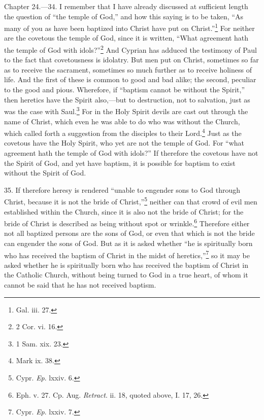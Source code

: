 
Chapter 24.—34. I remember that I have already discussed at sufficient length the question of ``the temple of God,'' and how this saying is to be taken, ``As many of you as have been baptized into Christ have put on Christ.''\footnote{\par  Gal. iii. 27.} For neither are the covetous the temple of God, since it is written, ``What agreement hath the temple of God with idols?''\footnote{\par  2 Cor. vi. 16.} And Cyprian has adduced the testimony of Paul to the fact that covetousness is idolatry. But men put on Christ, sometimes so far as to receive the sacrament, sometimes so much further as to receive holiness of life. And the first of these is common to good and bad alike; the second, peculiar to the good and pious. Wherefore, if ``baptism cannot be without the Spirit,'' then heretics have the Spirit also,—but to destruction, not to salvation, just as was the case with Saul.\footnote{\par  1 Sam. xix. 23.} For in the Holy Spirit devils are cast out through the name of Christ, which even he was able to do who was without the Church, which called forth a suggestion from the disciples to their Lord.\footnote{\par  Mark ix. 38.} Just as the covetous have the Holy Spirit, who yet are not the temple of God. For ``what agreement hath the temple of God with idols?'' If therefore the covetous have not the Spirit of God, and yet have baptism, it is possible for baptism to exist without the Spirit of God.

35. If therefore heresy is rendered ``unable to engender sons to God through Christ, because it is not the bride of Christ,''\footnote{\par  Cypr. \emph{Ep}. lxxiv. 6.} neither can that crowd of evil men established within the Church, since it is also not the bride of Christ; for the bride of Christ is described as being without spot or wrinkle.\footnote{\par  Eph. v. 27. Cp. Aug. \emph{ Retract}. ii. 18, quoted above, I. 17, 26.} Therefore either not all baptized persons are the sons of God, or even that which is not the bride can engender the sons of God. But as it is asked whether ``he is spiritually born who has received the baptism of Christ in the midst of heretics,''\footnote{\par  Cypr. \emph{Ep}. lxxiv. 7.} so it may be asked whether he is spiritually born who has received the baptism of Christ in the Catholic Church, without being turned to God in a true heart, of whom it cannot be said that he has not received baptism.

